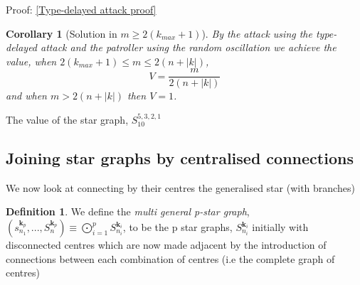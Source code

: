 \documentclass[a4paper,10pt]{article}
\newtheorem{corollary}[theorem]{Corollary}
\theoremstyle{definition}
\newtheorem{definition}[theorem]{Definition}
\theoremstyle{definition}
\theoremstyle{remark}
\theoremstyle{definition}
\begin{document}
Proof: \ref{Type-delayed attack proof}


\begin{corollary}[Solution in $m \geq 2(k_{max}+1)$]
By the attack using the type-delayed attack and the patroller using the random oscillation we achieve the value, when $2(k_{max}+1) \leq m \leq 2(n+|k|)$,
$$V= \frac{m}{2(n+|k|)} $$
and when $m > 2(n+|k|)$ then $V=1$.
\end{corollary}

\begin{myfigure}
\resizebox{0.95\linewidth}{!}{

}
\caption{The value of the star graph, $S_{10}^{5,3,2,1}$}
\end{myfigure}

\subsection{Joining star graphs by centralised connections}

We now look at connecting by their centres the generalised star (with branches)

\begin{definition}
We define the \textit{multi general p-star graph}, $(s_{n_{1}}^{\bm{k}_{p}},...,S_{n_{}}^{\bm{k}_{p}}) \equiv \bigodot\limits_{i=1}^{p} S_{n_{i}}^{\bm{k}_{i}}$, to be the p star graphs, $S_{n_{i}}^{\bm{k}_{i}}$ initially with disconnected centres which are now made adjacent by the introduction of connections between each combination of centres (i.e the complete graph of centres)
\end{definition}
\end{document}
